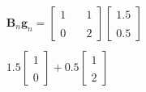 \documentclass[preview]{standalone}
\begin{document}
\begin{align*}
\mathbf{B}_n \mathbf{g}_n = \begin{bmatrix} 1 & \quad 1 \\ \\0 & \quad 2 \end{bmatrix}\begin{bmatrix} 1.5 \\ \\ 0.5 \end{bmatrix} \\\\1.5 \begin{bmatrix} 1 \\ \\ 0 \end{bmatrix} + 0.5 \begin{bmatrix} 1 \\ \\ 2 \end{bmatrix}
\end{align*}
\end{document}
